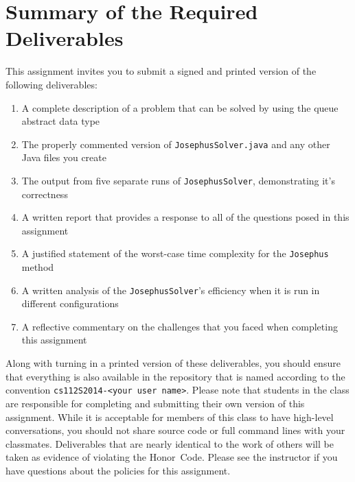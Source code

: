 \section*{Summary of the Required Deliverables}

  This assignment invites you to submit a signed and printed version of the following deliverables: 

  \begin{enumerate} 
  \itemsep0pt

  \item A complete description of a problem that can be solved by using the queue abstract data type

  \item The properly commented version of {\tt JosephusSolver.java} and any other Java files you create

  \item The output from five separate runs of {\tt JosephusSolver}, demonstrating it's correctness 

  \item A written report that provides a response to all of the questions posed in this assignment

  \item A justified statement of the worst-case time complexity for the {\tt Josephus} method

  \item A written analysis of the {\tt JosephusSolver}'s efficiency when it is run in different configurations 

  \item A reflective commentary on the challenges that you faced when completing this assignment 
   
  \end{enumerate}

  Along with turning in a printed version of these deliverables, you should ensure that everything is also available in
  the repository that is named according to the convention {\tt cs112S2014-<your user name>}. Please note that students
  in the class are responsible for completing and submitting their own version of this assignment.    While it is
  acceptable for members of this class to have high-level conversations, you should not share source code or full
  command lines with your classmates.  Deliverables that are nearly identical to the work of others will be taken as
  evidence of violating the \mbox{Honor Code}.  Please see the instructor if you have questions about the policies for
  this assignment.

  
